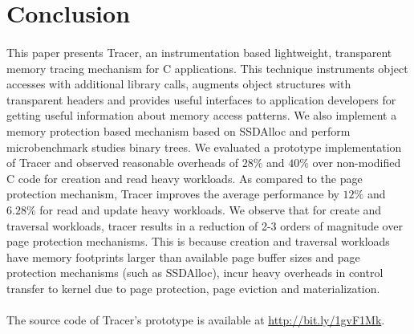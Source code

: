 \section{Conclusion}
\label{sec:conclusion}

\paragraph{}
This paper presents Tracer, an instrumentation based lightweight, transparent memory tracing mechanism for C applications. This technique instruments object accesses with additional library calls, augments object structures with transparent headers and provides useful interfaces to application developers for getting useful information about memory access patterns. We also implement a memory protection based mechanism based on SSDAlloc \cite{SSDAlloc} and perform microbenchmark studies binary trees. We evaluated a prototype implementation of Tracer and observed reasonable overheads of $28\%$ and $40\%$ over non-modified C code for creation and read heavy workloads. As compared to the page protection mechanism, Tracer improves the average performance by $12\%$ and $6.28\%$ for read and update heavy workloads. We observe that for create and traversal workloads, tracer results in a reduction of 2-3 orders of magnitude over page protection mechanisms. This is because creation and traversal workloads have memory footprints larger than available page buffer sizes and page protection mechanisms (such as SSDAlloc), incur heavy overheads in control transfer to kernel due to page protection, page eviction and materialization. 
\paragraph{}
The source code of Tracer's prototype is available at \url{http://bit.ly/1gvF1Mk}.